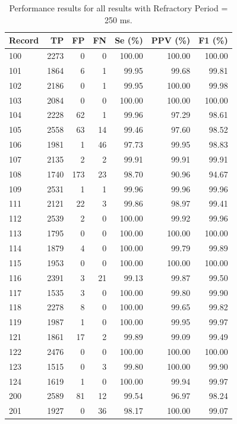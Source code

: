 \documentclass[11pt]{article}
\begin{document}
\begin{table}[p]
\centering
\scriptsize
\setlength{\tabcolsep}{4pt}
\renewcommand{\arraystretch}{1.1}
\caption{Performance results for all results with Refractory Period = 250 ms.}
\label{tab:all_records}
\begin{tabular}{lrrrrrr}
\toprule
\textbf{Record} & \textbf{TP} & \textbf{FP} & \textbf{FN} & \textbf{Se (\%)} & \textbf{PPV (\%)} & \textbf{F1 (\%)} \\
\midrule
100 & 2273 & 0 & 0 & 100.00 & 100.00 & 100.00 \\
101 & 1864 & 6 & 1 & 99.95 & 99.68 & 99.81 \\
102 & 2186 & 0 & 1 & 99.95 & 100.00 & 99.98 \\
103 & 2084 & 0 & 0 & 100.00 & 100.00 & 100.00 \\
104 & 2228 & 62 & 1 & 99.96 & 97.29 & 98.61 \\
105 & 2558 & 63 & 14 & 99.46 & 97.60 & 98.52 \\
106 & 1981 & 1 & 46 & 97.73 & 99.95 & 98.83 \\
107 & 2135 & 2 & 2 & 99.91 & 99.91 & 99.91 \\
108 & 1740 & 173 & 23 & 98.70 & 90.96 & 94.67 \\
109 & 2531 & 1 & 1 & 99.96 & 99.96 & 99.96 \\
111 & 2121 & 22 & 3 & 99.86 & 98.97 & 99.41 \\
112 & 2539 & 2 & 0 & 100.00 & 99.92 & 99.96 \\
113 & 1795 & 0 & 0 & 100.00 & 100.00 & 100.00 \\
114 & 1879 & 4 & 0 & 100.00 & 99.79 & 99.89 \\
115 & 1953 & 0 & 0 & 100.00 & 100.00 & 100.00 \\
116 & 2391 & 3 & 21 & 99.13 & 99.87 & 99.50 \\
117 & 1535 & 3 & 0 & 100.00 & 99.80 & 99.90 \\
118 & 2278 & 8 & 0 & 100.00 & 99.65 & 99.82 \\
119 & 1987 & 1 & 0 & 100.00 & 99.95 & 99.97 \\
121 & 1861 & 17 & 2 & 99.89 & 99.09 & 99.49 \\
122 & 2476 & 0 & 0 & 100.00 & 100.00 & 100.00 \\
123 & 1515 & 0 & 3 & 99.80 & 100.00 & 99.90 \\
124 & 1619 & 1 & 0 & 100.00 & 99.94 & 99.97 \\
200 & 2589 & 81 & 12 & 99.54 & 96.97 & 98.24 \\
201 & 1927 & 0 & 36 & 98.17 & 100.00 & 99.07 \\

\end{tabular}
\end{table}
\end{document}
